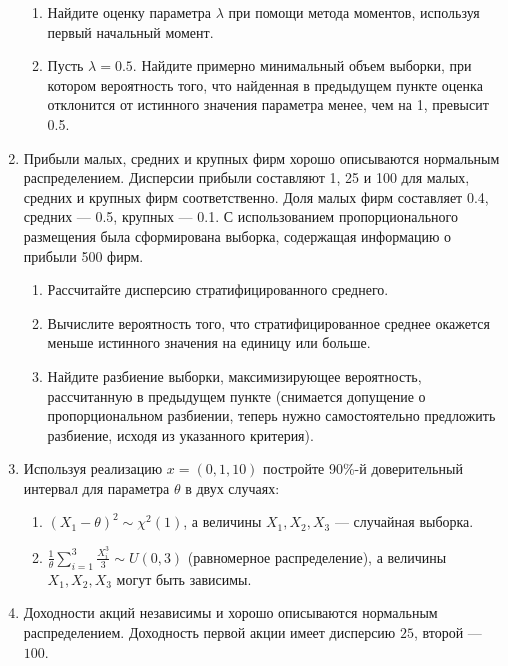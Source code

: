 \begin{enumerate}
\begin{enumerate}
\item Найдите оценку параметра $\lambda$ при помощи метода моментов, используя первый начальный момент.

\item Пусть $\lambda=0.5$. Найдите примерно минимальный объем выборки, 
при котором вероятность того, 
что найденная в предыдущем пункте оценка отклонится от истинного значения параметра менее, чем на 1, превысит 0.5.
\end{enumerate}

\item Прибыли малых, средних и крупных фирм хорошо описываются нормальным распределением. 
Дисперсии прибыли составляют 1, 25 и 100 для малых, средних и крупных фирм соответственно. 
Доля малых фирм составляет 0.4, средних — 0.5, крупных — 0.1. С использованием пропорционального размещения была сформирована выборка, 
содержащая информацию о прибыли 500 фирм.
\begin{enumerate}
\item Рассчитайте дисперсию стратифицированного среднего.
\item Вычислите вероятность того, что стратифицированное среднее окажется меньше истинного значения на единицу или больше.
\item Найдите разбиение выборки, максимизирующее вероятность, рассчитанную в предыдущем пункте (снимается допущение о пропорциональном разбиении, 
теперь нужно самостоятельно предложить разбиение, исходя из указанного критерия).
\end{enumerate}


\item Используя реализацию $x=(0, 1, 10)$ постройте 90\%-й доверительный интервал для параметра $\theta$ в двух случаях:

\begin{enumerate}

\item $(X_{1}-\theta) ^ 2\sim \chi^2(1)$, а величины $X_1, X_2, X_3$ — случайная выборка.

\item $\frac{1}{\theta}\sum\limits_{i=1}^{3}\frac{X_{i}^3}{3}\sim U\left(0, 3\right)$ (равномерное распределение), 
а величины $X_1, X_2, X_3$ могут быть зависимы. 
\end{enumerate}

\item Доходности акций независимы и хорошо описываются нормальным распределением. Доходность первой акции имеет дисперсию $25$, второй — $100$. 


\end{enumerate}
